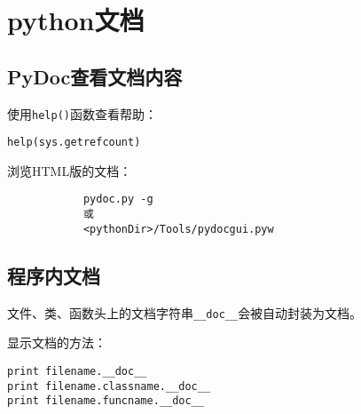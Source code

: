 
\chapter{python文档}

	\section{PyDoc查看文档内容}

		使用\verb|help()|函数查看帮助：
\begin{lstlisting}
help(sys.getrefcount)
\end{lstlisting}

		浏览HTML版的文档：

		\begin{verbatim}
			pydoc.py -g
			或
			<pythonDir>/Tools/pydocgui.pyw
		\end{verbatim}

	\section{程序内文档}

		文件、类、函数头上的文档字符串\verb|__doc__|会被自动封装为文档。

		显示文档的方法：

\begin{lstlisting}
print filename.__doc__
print filename.classname.__doc__
print filename.funcname.__doc__
\end{lstlisting}

